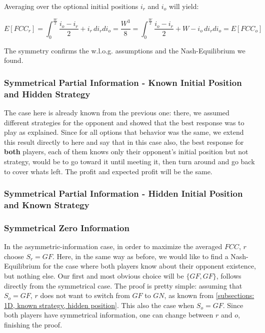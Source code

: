 \documentclass[a4paper,10pt]{article}
\newcommand\rob{\ensuremath{r}\xspace}
\newcommand\opp{\ensuremath{o}\xspace}
\newcommand{\w}{\ensuremath{W}\xspace}
\newcommand{\fcc}{\ensuremath{FCC}\xspace}
\newcommand{\gn}{\ensuremath{GN}\xspace}
\newcommand{\gf}{\ensuremath{GF}\xspace}
\begin{document}
Averaging over the optional initial positions $i_{\rob}$ and $i_{\opp}$ will yield:

\[E\left[\fcc_{\rob}\right]=\int_{0}^{\frac{\w}{2}}{\frac{i_{\opp} - i_{\rob}}{2}+i_{\rob}} \, di_{\rob} di_{\opp}=\frac{\w^3}{8}=\int_{0}^{\frac{\w}{2}}{\frac{i_{\opp} - i_{\rob}}{2}+\w-i_{\opp}} \, di_{\rob} di_{\opp}=E\left[\fcc_{\opp}\right]\]

The symmetry confirms the w.l.o.g. assumptions and the Nash-Equilibrium we found.

\subsubsection{Symmetrical Partial Information - Known Initial Position and Hidden Strategy}
The case here is already known from the previous one: there, we assumed different strategies for the opponent and showed that the best response was to play as explained. Since for all options that behavior was the same, we extend this result directly to here and say that in this case also, the best response for \textbf{both} players, each of them knows only their opponent's initial position but not strategy, would be to go toward it until meeting it, then turn around and go back to cover whats left.
The profit and expected profit will be the same.

\subsubsection{Symmetrical Partial Information - Hidden Initial Position and Known Strategy}

\subsubsection{Symmetrical Zero Information}
In the asymmetric-information case, in order to maximize the averaged \fcc, \rob choose $S_\rob=\gf$.
Here, in the same way as before, we would like to find a Nash-Equilibrium for the case where both players know about their opponent existence, but nothing else.
Our first and most obvious choice will be $\lbrace \gf, \gf \rbrace$, follows directly from the symmetrical case.
The proof is pretty simple: assuming that $S_\opp = \gf$, \rob does not want to switch from \gf to \gn, as known from \ref{subsections: 1D, known strategy, hidden position}. This also the case when $S_\opp=\gf$.
Since both players have symmetrical information, one can change between \rob and \opp, finishing the proof. 
\end{document}
